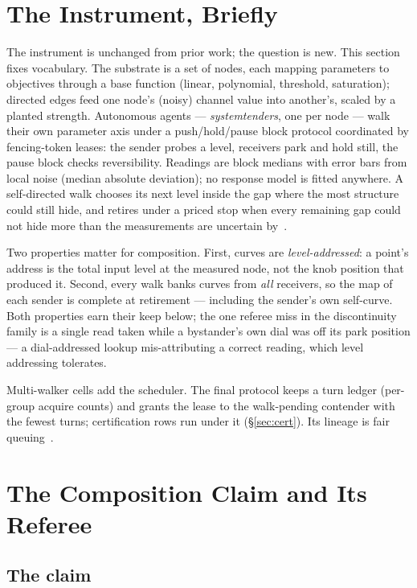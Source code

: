 \documentclass[11pt,a4paper]{article}
\begin{document}
\section{The Instrument, Briefly}
\label{sec:instrument}

The instrument is unchanged from prior work; the question is new. This
section fixes vocabulary. The substrate is a set of nodes, each
mapping parameters to objectives through a base function (linear,
polynomial, threshold, saturation); directed edges feed one node's
(noisy) channel value into another's, scaled by a planted strength.
Autonomous agents --- \emph{systemtenders}, one per node --- walk their
own parameter axis under a push/hold/pause block protocol coordinated
by fencing-token leases: the sender probes a level, receivers park and
hold still, the pause block checks reversibility. Readings are block
medians with error bars from local noise (median absolute deviation);
no response model is fitted anywhere. A self-directed walk chooses its
next level inside the gap where the most structure could still hide,
and retires under a priced stop when every remaining gap could not
hide more than the measurements are uncertain by~\cite{p2}.

Two properties matter for composition. First, curves are
\emph{level-addressed}: a point's address is the total input level at
the measured node, not the knob position that produced it. Second,
every walk banks curves from \emph{all} receivers, so the map of each
sender is complete at retirement --- including the sender's own
self-curve. Both properties earn their keep below; the one referee
miss in the discontinuity family is a single read taken while a
bystander's own dial was off its park position --- a dial-addressed
lookup mis-attributing a correct reading, which level addressing
tolerates.

Multi-walker cells add the scheduler. The final protocol keeps a turn
ledger (per-group acquire counts) and grants the lease to the
walk-pending contender with the fewest turns; certification rows run
under it (\S\ref{sec:cert}). Its lineage is fair
queuing~\cite{demers1990,shreedhar1995}.

\section{The Composition Claim and Its Referee}
\label{sec:referee}

\subsection{The claim}
\end{document}
